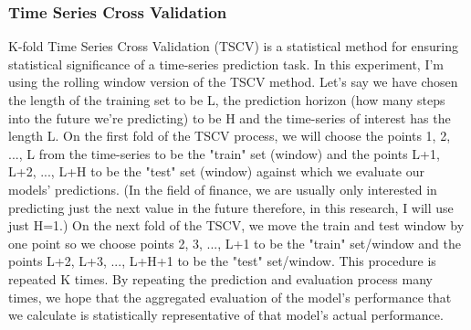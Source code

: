 \subsubsection{Time Series Cross Validation}

K-fold Time Series Cross Validation (TSCV) is a statistical method for ensuring statistical significance of a time-series prediction task. In this experiment, I'm using the rolling window version of the TSCV method. Let's say we have chosen the length of the training set to be L, the prediction horizon (how many steps into the future we're predicting) to be H and the time-series of interest has the length L. On the first fold of the TSCV process, we will choose the points 1, 2, ..., L from the time-series to be the "train" set (window) and the points L+1, L+2, ..., L+H to be the "test" set (window) against which we evaluate our models' predictions. (In the field of finance, we are usually only interested in predicting just the next value in the future therefore, in this research, I will use just H=1.) On the next fold of the TSCV, we move the train and test window by one point so we choose points 2, 3, ..., L+1 to be the "train" set/window and the points L+2, L+3, ..., L+H+1 to be the "test" set/window. This procedure is repeated K times. By repeating the prediction and evaluation process many times, we hope that the aggregated evaluation of the model's performance that we calculate is statistically representative of that model's actual performance.




